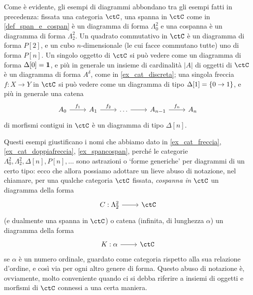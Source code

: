 \begin{remark}\label{tante_cose_sono_diag}
	Come è evidente, gli esempi di diagrammi abbondano tra gli esempi fatti in precedenza: fissata una categoria \(\ctC\), una spanna in \(\ctC\) come in \ref{def_span_e_cospan} è un diagramma di forma \(\Lambda^2_0\) e una cospanna è un diagramma di forma \(\Lambda^2_2\). Un quadrato commutativo in \(\ctC\) è un diagramma di forma \(P[2]\), e un cubo \(n\)-dimensionale (le cui facce commutano tutte) uno di forma \(P[n]\). Un singolo oggetto di \(\ctC\) si può vedere come un diagramma di forma \(\Delta[0]=\mathbf{1}\), e più in generale un insieme di cardinalità \(|A|\) di oggetti di \(\ctC\) è un diagramma di forma \(A^\delta\), come in \ref{ex_cat_discreta}; una singola freccia \(f : X\to Y\) in \(\ctC\) si può vedere come un diagramma di tipo \(\Delta[1] = \{0\to 1\}\), e più in generale una catena
	\[\begin{tikzcd}
			A_0 \ar[r, "f_1"] & A_1 \ar[r, "f_2"] & \dots \ar[r] & A_{n-1} \ar[r, "f_n"] & A_n
		\end{tikzcd}
	\]
	di morfismi contigui in \(\ctC\) è un diagramma di tipo \(\Delta[n]\).

	Questi esempi giustificano i nomi che abbiamo dato in \ref{ex_cat_freccia}, \ref{ex_cat_doppiafreccia}, \ref{ex_spancospan}, perché le categorie \(\Lambda^2_0,\Lambda^2_2,\Delta[n], P[n], \dots\)  sono astrazioni o `forme generiche' per diagrammi di un certo tipo: ecco che allora possiamo adottare un lieve abuso di notazione, nel chiamare, per una qualche categoria \(\ctC\) fissata, \emph{cospanna in \(\ctC\)} un diagramma della forma
	\[\dmFun C{\Lambda^2_2}\ctC\]
	(e dualmente una spanna in \(\ctC\)) o catena (infinita, di lunghezza \(\alpha\)) un diagramma della forma
	\[\dmFun K\alpha\ctC\]
	se \(\alpha\) è un numero ordinale, guardato come categoria rispetto alla sua relazione d'ordine, e così via per ogni altro genere di forma. Questo abuso di notazione è, ovviamente, molto conveniente quando ci si debba riferire a insiemi di oggetti e morfismi di \(\ctC\) connessi a una certa maniera.
\end{remark}

